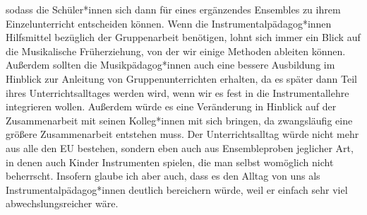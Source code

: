 sodass die Schüler*innen sich dann für eines ergänzendes Ensembles zu ihrem Einzelunterricht
entscheiden können. Wenn die Instrumentalpädagog*innen Hilfsmittel bezüglich der
Gruppenarbeit benötigen, lohnt sich immer ein Blick auf die Musikalische
Früherziehung, von der wir einige Methoden ableiten können. Außerdem sollten die
Musikpädagog*innen auch eine bessere Ausbildung im Hinblick zur Anleitung von
Gruppenunterrichten erhalten, da es später dann Teil ihres Unterrichtsalltages
werden wird, wenn wir es fest in die Instrumentallehre integrieren wollen.
Außerdem würde es eine Veränderung in Hinblick auf der Zusammenarbeit mit seinen
Kolleg*innen mit sich bringen, da zwangsläufig eine größere Zusammenarbeit
entstehen muss. Der Unterrichtsalltag würde nicht mehr aus alle den EU bestehen,
sondern eben auch aus Ensembleproben jeglicher Art, in denen auch Kinder
Instrumenten spielen, die man selbst womöglich nicht beherrscht. Insofern glaube
ich aber auch, dass es den Alltag von uns als Instrumentalpädagog*innen deutlich
bereichern würde, weil er einfach sehr viel abwechslungsreicher wäre. 













